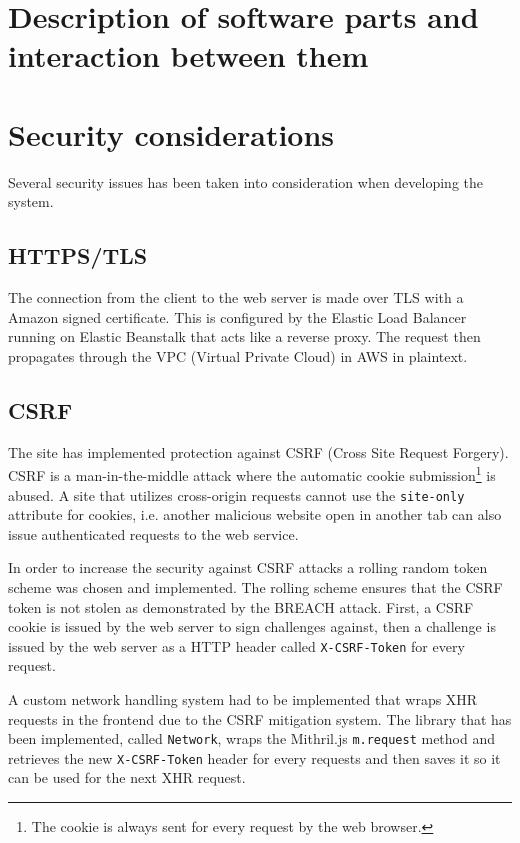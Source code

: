 \documentclass[12pt,a4paper]{report}
\begin{document}
\chapter{Description of software parts and interaction between them}

\newpage

\chapter{Security considerations}
Several security issues has been taken into consideration when developing the system.

\section{HTTPS/TLS}
The connection from the client to the web server is made over TLS with a Amazon signed certificate.
This is configured by the Elastic Load Balancer running on Elastic Beanstalk that acts like a reverse proxy.
The request then propagates through the VPC (Virtual Private Cloud) in AWS in plaintext. 

\section{CSRF}
\label{subsec:csrf}
The site has implemented protection against CSRF (Cross Site Request Forgery). CSRF is a man-in-the-middle attack where the automatic cookie submission\footnote{The cookie is always sent for every request by the web browser.} is abused. A site that utilizes cross-origin requests cannot use the \texttt{site-only} attribute for cookies, i.e. another malicious website open in another tab can also issue authenticated requests to the web service\cite{rick}.

In order to increase the security against CSRF attacks a rolling random token scheme was chosen and implemented. The rolling scheme ensures that the CSRF token is not stolen as demonstrated by the BREACH attack\cite{breach}. First, a CSRF cookie is issued by the web server to sign challenges against, then a challenge is issued by the web server as a HTTP header called \texttt{X-CSRF-Token} for every request.

A custom network handling system had to be implemented that wraps XHR requests in the frontend due to the CSRF mitigation system.  The library that has been implemented, called \texttt{Network}\cite{roaster-network}, wraps the Mithril.js \texttt{m.request} method and retrieves the new \texttt{X-CSRF-Token} header for every requests and then saves it so it can be used for the next XHR request.
\end{document}
